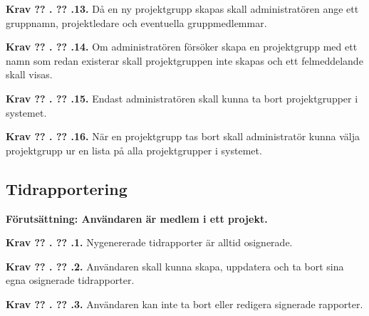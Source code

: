 \documentclass[a4paper]{article}
\newcommand\getcurrentref[1]{%
 \ifnumequal{\value{#1}}{0}
  {??}
  {\the\value{#1}}%
}
\newcommand\requirement[2]{
	\numberedrow{Krav}{#1}{#2}
}
\newcommand\numberedrow[3]{
	\noindent
	\textbf{#1 \getcurrentref{section}.\getcurrentref{subsection}.#2.} #3
	
}
\begin{document}
\requirement{13}{Då en ny projektgrupp skapas skall administratören ange ett gruppnamn, projektledare och eventuella gruppmedlemmar.}

\requirement{14}{Om administratören försöker skapa en projektgrupp med ett namn som redan existerar skall projektgruppen inte skapas och ett felmeddelande skall visas.}
\requirement{15}{Endast administratören skall kunna ta bort projektgrupper i systemet.}
\requirement{16}{När en projektgrupp tas bort skall administratör kunna välja projektgrupp ur en lista på alla projektgrupper i systemet.}



\subsection{Tidrapportering}
\textbf{Förutsättning: Användaren är medlem i ett projekt.}\newline
\requirement{1}{Nygenererade tidrapporter är alltid osignerade.}
\requirement{2}{Användaren skall kunna skapa, uppdatera och ta bort sina egna osignerade tidrapporter.}
\requirement{3}{Användaren kan inte ta bort eller redigera signerade rapporter.} 


\end{document}
